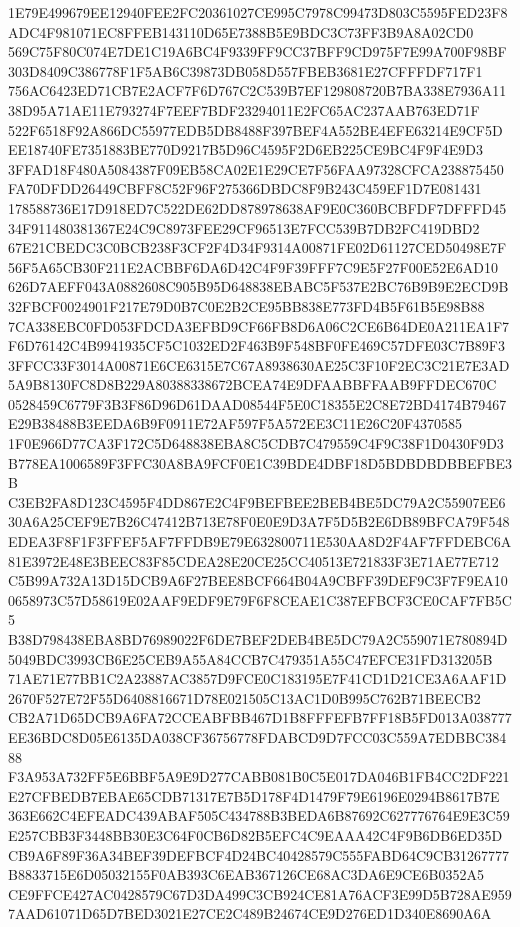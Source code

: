 \documentclass[UTF8,fontset=fandol,zihao=-4,a4paper]{ctexart}
\begin{document}
{{1E79E499679EE12940FEE2FC20361027CE995C7978C99473D803C5595FED23F8ADC4F981071EC8FFEB143110D65E7388B5E9BDC3C73FF3B9A8A02CD0
569C75F80C074E7DE1C19A6BC4F9339FF9CC37BFF9CD975F7E99A700F98BF303D8409C386778F1F5AB6C39873DB058D557FBEB3681E27CFFFDF717F1
756AC6423ED71CB7E2ACF7F6D767C2C539B7EF129808720B7BA338E7936A1138D95A71AE11E793274F7EEF7BDF23294011E2FC65AC237AAB763ED71F
522F6518F92A866DC55977EDB5DB8488F397BEF4A552BE4EFE63214E9CF5DEE18740FE7351883BE770D9217B5D96C4595F2D6EB225CE9BC4F9F4E9D3
3FFAD18F480A5084387F09EB58CA02E1E29CE7F56FAA97328CFCA238875450FA70DFDD26449CBFF8C52F96F275366DBDC8F9B243C459EF1D7E081431
178588736E17D918ED7C522DE62DD878978638AF9E0C360BCBFDF7DFFFD4534F911480381367E24C9C8973FEE29CF96513E7FCC539B7DB2FC419DBD2
67E21CBEDC3C0BCB238F3CF2F4D34F9314A00871FE02D61127CED50498E7F56F5A65CB30F211E2ACBBF6DA6D42C4F9F39FFF7C9E5F27F00E52E6AD10
626D7AEFF043A0882608C905B95D648838EBABC5F537E2BC76B9B9E2ECD9B32FBCF0024901F217E79D0B7C0E2B2CE95BB838E773FD4B5F61B5E98B88
7CA338EBC0FD053FDCDA3EFBD9CF66FB8D6A06C2CE6B64DE0A211EA1F7F6D76142C4B9941935CF5C1032ED2F463B9F548BF0FE469C57DFE03C7B89F3
3FFCC33F3014A00871E6CE6315E7C67A8938630AE25C3F10F2EC3C21E7E3AD5A9B8130FC8D8B229A80388338672BCEA74E9DFAABBFFAAB9FFDEC670C
0528459C6779F3B3F86D96D61DAAD08544F5E0C18355E2C8E72BD4174B79467E29B38488B3EEDA6B9F0911E72AF597F5A572EE3C11E26C20F4370585
1F0E966D77CA3F172C5D648838EBA8C5CDB7C479559C4F9C38F1D0430F9D3B778EA1006589F3FFC30A8BA9FCF0E1C39BDE4DBF18D5BDBDBDBBEFBE3B
C3EB2FA8D123C4595F4DD867E2C4F9BEFBEE2BEB4BE5DC79A2C55907EE630A6A25CEF9E7B26C47412B713E78F0E0E9D3A7F5D5B2E6DB89BFCA79F548
EDEA3F8F1F3FFEF5AF7FFDB9E79E632800711E530AA8D2F4AF7FFDEBC6A81E3972E48E3BEEC83F85CDEA28E20CE25CC40513E721833F3E71AE77E712
C5B99A732A13D15DCB9A6F27BEE8BCF664B04A9CBFF39DEF9C3F7F9EA100658973C57D58619E02AAF9EDF9E79F6F8CEAE1C387EFBCF3CE0CAF7FB5C5
B38D798438EBA8BD76989022F6DE7BEF2DEB4BE5DC79A2C559071E780894D5049BDC3993CB6E25CEB9A55A84CCB7C479351A55C47EFCE31FD313205B
71AE71E77BB1C2A23887AC3857D9FCE0C183195E7F41CD1D21CE3A6AAF1D2670F527E72F55D6408816671D78E021505C13AC1D0B995C762B71BEECB2
CB2A71D65DCB9A6FA72CCEABFBB467D1B8FFFEFB7FF18B5FD013A038777EE36BDC8D05E6135DA038CF36756778FDABCD9D7FCC03C559A7EDBBC38488
F3A953A732FF5E6BBF5A9E9D277CABB081B0C5E017DA046B1FB4CC2DF221E27CFBEDB7EBAE65CDB71317E7B5D178F4D1479F79E6196E0294B8617B7E
363E662C4EFEADC439ABAF505C434788B3BEDA6B87692C627776764E9E3C59E257CBB3F3448BB30E3C64F0CB6D82B5EFC4C9EAAA42C4F9B6DB6ED35D
CB9A6F89F36A34BEF39DEFBCF4D24BC40428579C555FABD64C9CB31267777B8833715E6D05032155F0AB393C6EAB367126CE68AC3DA6E9CE6B0352A5
CE9FFCE427AC0428579C67D3DA499C3CB924CE81A76ACF3E99D5B728AE9597AAD61071D65D7BED3021E27CE2C489B24674CE9D276ED1D340E8690A6A
}}
\end{document}
